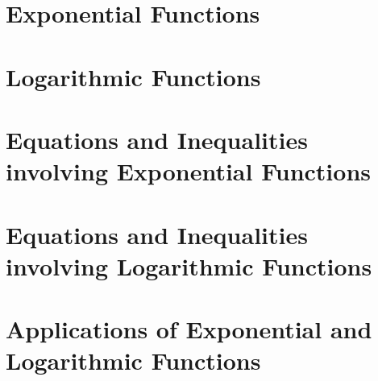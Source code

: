 \section{Exponential Functions}



\clearpage

\section{Logarithmic Functions}

%

\clearpage


%

\clearpage

\section{Equations and Inequalities involving Exponential Functions}

%

\clearpage

\section{Equations and Inequalities involving Logarithmic Functions}

%

\clearpage

\section{Applications of Exponential and Logarithmic Functions}

%
